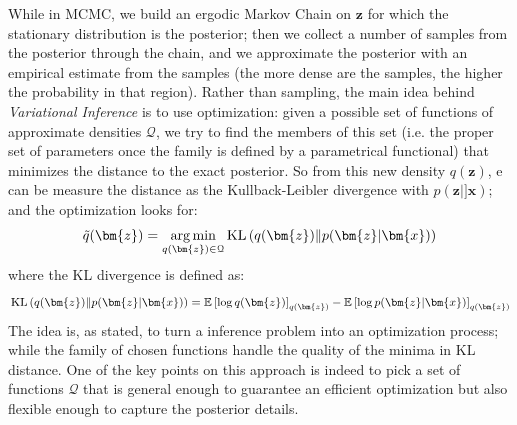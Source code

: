While in \acl{MCMC}, we build an ergodic Markov Chain on $\bm{z}$ for which the stationary distribution is the posterior; then we collect a number of samples from the posterior through the chain, and we approximate the posterior with an empirical estimate from the samples (the more dense are the samples, the higher the probability in that region).
Rather than sampling, the main idea behind \textit{Variational Inference} is to use optimization: given a possible set of functions of approximate densities $\mathcal{Q}$, we try to find the members of this set (i.e. the proper set of parameters once the family is defined by a parametrical functional) that minimizes the distance to the exact posterior. So from this new density $q(\bm{z})$, e can be measure the distance as the Kullback-Leibler divergence with $p(\bm{z}|]\bm{x})$; and the optimization looks for:
\begin{equation}
    \tilde{q}(\bm{z}) = \argmin{q(\bm{z}) \in \mathcal{Q}} \KLD{q(\bm{z})}{p(\bm{z}|\bm{x})}
    \label{eq:variational_inference}
\end{equation}
where the KL divergence is defined as:
\begin{equation}
    \KLD{q(\bm{z})}{p(\bm{z}|\bm{x})} = \expectation{\log q(\bm{z})}_{q(\bm{z})} - \expectation{\log p(\bm{z}|\bm{x})}_{q(\bm{z})}
    \label{eq:kulback-leibler}
\end{equation}
The idea is, as stated, to turn a inference problem into an optimization process; while the family of chosen functions handle the quality of the minima in KL distance. One of the key points on this approach is indeed to pick a set of functions $\mathcal{Q}$ that is general enough to guarantee an efficient optimization but also flexible enough to capture the posterior details.

